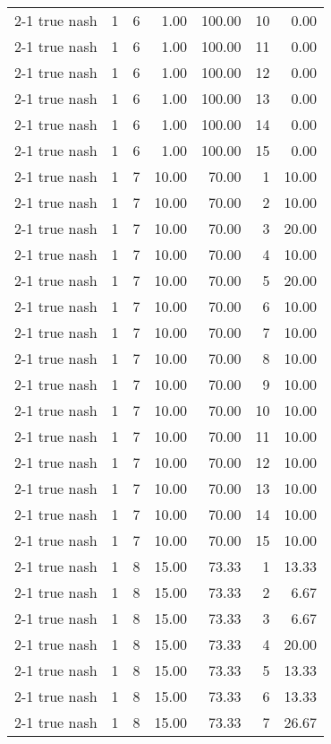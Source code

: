 \begin{tabular}{lrrrrrr}
2-1  true nash & 1 & 6 & 1.00 & 100.00 & 10 & 0.00 \\
2-1  true nash & 1 & 6 & 1.00 & 100.00 & 11 & 0.00 \\
2-1  true nash & 1 & 6 & 1.00 & 100.00 & 12 & 0.00 \\
2-1  true nash & 1 & 6 & 1.00 & 100.00 & 13 & 0.00 \\
2-1  true nash & 1 & 6 & 1.00 & 100.00 & 14 & 0.00 \\
2-1  true nash & 1 & 6 & 1.00 & 100.00 & 15 & 0.00 \\
2-1  true nash & 1 & 7 & 10.00 & 70.00 & 1 & 10.00 \\
2-1  true nash & 1 & 7 & 10.00 & 70.00 & 2 & 10.00 \\
2-1  true nash & 1 & 7 & 10.00 & 70.00 & 3 & 20.00 \\
2-1  true nash & 1 & 7 & 10.00 & 70.00 & 4 & 10.00 \\
2-1  true nash & 1 & 7 & 10.00 & 70.00 & 5 & 20.00 \\
2-1  true nash & 1 & 7 & 10.00 & 70.00 & 6 & 10.00 \\
2-1  true nash & 1 & 7 & 10.00 & 70.00 & 7 & 10.00 \\
2-1  true nash & 1 & 7 & 10.00 & 70.00 & 8 & 10.00 \\
2-1  true nash & 1 & 7 & 10.00 & 70.00 & 9 & 10.00 \\
2-1  true nash & 1 & 7 & 10.00 & 70.00 & 10 & 10.00 \\
2-1  true nash & 1 & 7 & 10.00 & 70.00 & 11 & 10.00 \\
2-1  true nash & 1 & 7 & 10.00 & 70.00 & 12 & 10.00 \\
2-1  true nash & 1 & 7 & 10.00 & 70.00 & 13 & 10.00 \\
2-1  true nash & 1 & 7 & 10.00 & 70.00 & 14 & 10.00 \\
2-1  true nash & 1 & 7 & 10.00 & 70.00 & 15 & 10.00 \\
2-1  true nash & 1 & 8 & 15.00 & 73.33 & 1 & 13.33 \\
2-1  true nash & 1 & 8 & 15.00 & 73.33 & 2 & 6.67 \\
2-1  true nash & 1 & 8 & 15.00 & 73.33 & 3 & 6.67 \\
2-1  true nash & 1 & 8 & 15.00 & 73.33 & 4 & 20.00 \\
2-1  true nash & 1 & 8 & 15.00 & 73.33 & 5 & 13.33 \\
2-1  true nash & 1 & 8 & 15.00 & 73.33 & 6 & 13.33 \\
2-1  true nash & 1 & 8 & 15.00 & 73.33 & 7 & 26.67 \\

\end{tabular}
